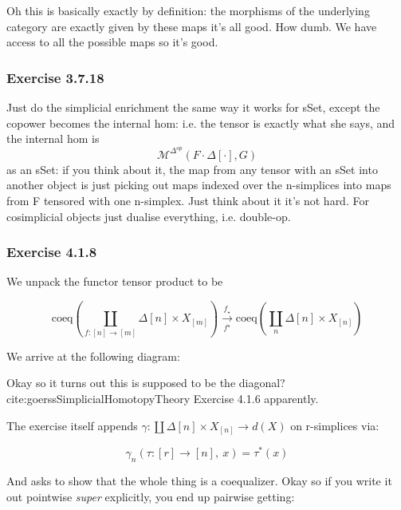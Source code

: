 \documentclass{article}
\begin{document}
Oh this is basically exactly by definition: the morphisms of the underlying category are exactly given by these maps it's all good. How dumb. We have access to all the possible maps so it's good.

\subsubsection{Exercise 3.7.18}
\label{sec:orge50a964}
Just do the simplicial enrichment the same way it works for sSet, except the copower becomes the internal hom: i.e. the tensor is exactly what she says, and the internal hom is \[\mathcal{M}^{\Delta^{op}}(F\cdot\Delta[\cdot], G)\] as an sSet: if you think about it, the map from any tensor with an sSet into another object is just picking out maps indexed over the n-simplices into maps from F tensored with one n-simplex. Just think about it it's not hard. For cosimplicial objects just dualise everything, i.e. double-op.

\subsubsection{Exercise 4.1.8}
\label{sec:orgaf6e38b}
We unpack the functor tensor product to be

\[
\text{coeq}\left(\coprod_{f:[n] \to [m]} \Delta [n] \times X_{[m]}\right) \xrightarrow[f^{\star}]{f_{\star}} \text{coeq}\left(\coprod_{n} \Delta [n] \times X_{[n]}\right)
\]


We arrive at the following diagram:


Okay so it turns out this is supposed to be the diagonal? cite:goerssSimplicialHomotopyTheory Exercise 4.1.6 apparently. 

The exercise itself appends \(\gamma: \coprod \Delta[n] \times X_{[n]} \to d(X)\) on r-simplices via:

\[
\gamma_{n}(\tau:[r] \to [n], \ x) = \tau^{*}(x)
\]

And asks to show that the whole thing is a coequalizer. Okay so if you write it out pointwise \emph{super} explicitly, you end up pairwise getting:
\end{document}
